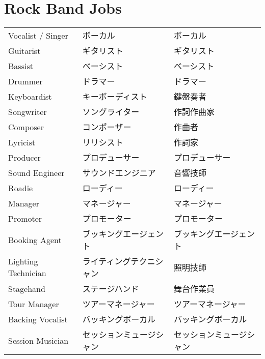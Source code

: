 \documentclass[11pt]{article}
\begin{document}
\section*{Rock Band Jobs}
\label{sec:orgb9a03ba}
\begin{center}
\begin{tabular}{lll}
Vocalist / Singer & ボーカル & ボーカル\\[0pt]
Guitarist & ギタリスト & ギタリスト\\[0pt]
Bassist & ベーシスト & ベーシスト\\[0pt]
Drummer & ドラマー & ドラマー\\[0pt]
Keyboardist & キーボーディスト & 鍵盤奏者\\[0pt]
Songwriter & ソングライター & 作詞作曲家\\[0pt]
Composer & コンポーザー & 作曲者\\[0pt]
Lyricist & リリシスト & 作詞家\\[0pt]
Producer & プロデューサー & プロデューサー\\[0pt]
Sound Engineer & サウンドエンジニア & 音響技師\\[0pt]
Roadie & ローディー & ローディー\\[0pt]
Manager & マネージャー & マネージャー\\[0pt]
Promoter & プロモーター & プロモーター\\[0pt]
Booking Agent & ブッキングエージェント & ブッキングエージェント\\[0pt]
Lighting Technician & ライティングテクニシャン & 照明技師\\[0pt]
Stagehand & ステージハンド & 舞台作業員\\[0pt]
Tour Manager & ツアーマネージャー & ツアーマネージャー\\[0pt]
Backing Vocalist & バッキングボーカル & バッキングボーカル\\[0pt]
Session Musician & セッションミュージシャン & セッションミュージシャン\\[0pt]
\end{tabular}
\end{center}
\end{document}
